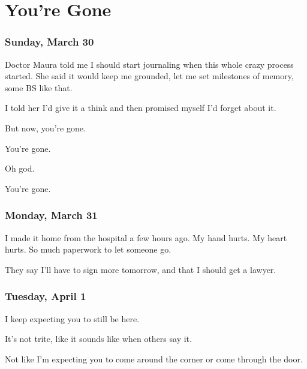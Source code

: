 \hypertarget{youre-gone}{%
\chapter{You're Gone}\label{youre-gone}}

{
\setlength{\parindent}{0cm}
\setlength{\parskip}{5pt}

\subsection*{Sunday, March 30}\label{sunday-march-30}

 Doctor Maura told me I should start journaling when this whole crazy process started. She said it would keep me grounded, let me set milestones of memory, some BS like that.

 I told her I'd give it a think and then promised myself I'd forget about it.

 But now, you're gone.

 You're gone.

 Oh god.

 You're gone.

\newpage

\subsection*{Monday, March 31}\label{monday-march-31}

 I made it home from the hospital a few hours ago. My hand hurts. My heart hurts. So much paperwork to let someone go.

 They say I'll have to sign more tomorrow, and that I should get a lawyer.

\newpage

\subsection*{Tuesday, April 1}\label{tuesday-april-1}

 I keep expecting you to still be here.

 It's not trite, like it sounds like when others say it.

 Not like I'm expecting you to come around the corner or come through the door.

}
